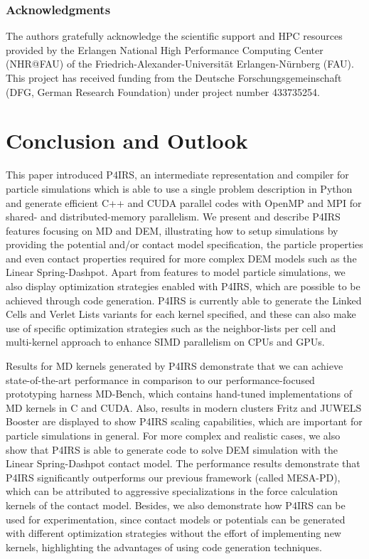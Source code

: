 \documentclass[Afour,sageh,times]{sagej}
\begin{document}
\subsubsection*{Acknowledgments}

The authors gratefully acknowledge the scientific support and HPC resources provided by the Erlangen National High Performance Computing Center (NHR@FAU) of the Friedrich-Alexander-Universität Erlangen-Nürnberg (FAU).
This project has received funding from the Deutsche Forschungsgemeinschaft (DFG, German Research Foundation) under project number 433735254.

\section{Conclusion and Outlook}
\label{sec:conclusion}

This paper introduced P4IRS, an intermediate representation and compiler for particle simulations which is able to use a single problem description in Python and generate efficient C++ and CUDA parallel codes with OpenMP and MPI for shared- and distributed-memory parallelism.
We present and describe P4IRS features focusing on \ac{MD} and \ac{DEM}, illustrating how to setup simulations by providing the potential and/or contact model specification, the particle properties and even contact properties required for more complex DEM models such as the Linear Spring-Dashpot.
Apart from features to model particle simulations, we also display optimization strategies enabled with P4IRS, which are possible to be achieved through code generation.
P4IRS is currently able to generate the Linked Cells and Verlet Lists variants for each kernel specified, and these can also make use of specific optimization strategies such as the neighbor-lists per cell and multi-kernel approach to enhance SIMD parallelism on CPUs and GPUs.

Results for \ac{MD} kernels generated by P4IRS demonstrate that we can achieve state-of-the-art performance in comparison to our performance-focused prototyping harness MD-Bench, which contains hand-tuned implementations of \ac{MD} kernels in C and CUDA.
Also, results in modern clusters Fritz and JUWELS Booster are displayed to show P4IRS scaling capabilities, which are important for particle simulations in general.
For more complex and realistic cases, we also show that P4IRS is able to generate code to solve \ac{DEM} simulation with the Linear Spring-Dashpot contact model.
The performance results demonstrate that P4IRS significantly outperforms our previous framework (called MESA-PD), which can be attributed to aggressive specializations in the force calculation kernels of the contact model.
Besides, we also demonstrate how P4IRS can be used for experimentation, since contact models or potentials can be generated with different optimization strategies without the effort of implementing new kernels, highlighting the advantages of using code generation techniques.
\end{document}
